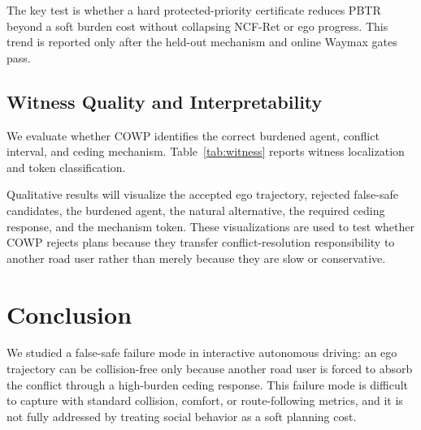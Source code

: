 \documentclass[10pt]{article}
\begin{document}
The key test is whether a hard protected-priority certificate reduces PBTR beyond a soft burden cost without collapsing NCF-Ret or ego progress. This trend is reported only after the held-out mechanism and online Waymax gates pass.

\subsection{Witness Quality and Interpretability}
\label{sec:witness_quality}

We evaluate whether COWP identifies the correct burdened agent, conflict interval, and ceding mechanism. Table~\ref{tab:witness} reports witness localization and token classification.

\begin{table}[t]
\centering
\caption{Coercion witness quality.}
\label{tab:witness}
\end{table}

Qualitative results will visualize the accepted ego trajectory, rejected false-safe candidates, the burdened agent, the natural alternative, the required ceding response, and the mechanism token. These visualizations are used to test whether COWP rejects plans because they transfer conflict-resolution responsibility to another road user rather than merely because they are slow or conservative.

\section{Conclusion}
\label{sec:conclusion}

We studied a false-safe failure mode in interactive autonomous driving: an ego trajectory can be collision-free only because another road user is forced to absorb the conflict through a high-burden ceding response. This failure mode is difficult to capture with standard collision, comfort, or route-following metrics, and it is not fully addressed by treating social behavior as a soft planning cost.
\end{document}
